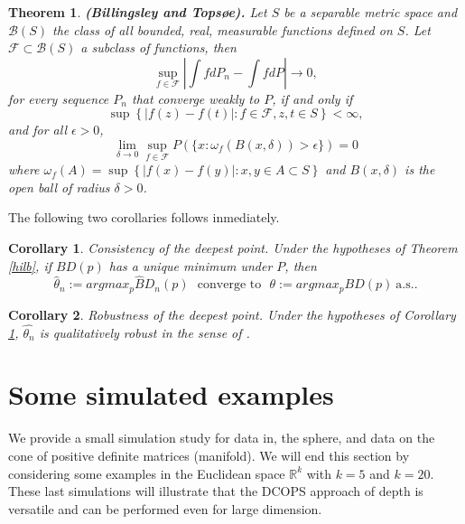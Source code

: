 \documentclass[a4paper]{article}
\numberwithin{equation}{section}
\newtheorem{theorem}{Theorem}[section]
\newtheorem{corollary}{Corollary}
\begin{document}
\begin{theorem}
\textbf{(Billingsley and Tops{\o}e).}  \textit{Let $S$ be a separable metric space and $\mathcal{B}(S)$ the class of all bounded, real,  measurable functions defined on $S$. Let $\mathcal{F} \subset \mathcal{B}(S)$ a subclass of functions, then 
$$
 \sup_{f \in \mathcal{F} } \left \vert \int f dP_n  - \int f dP \right \vert  \rightarrow 0,
$$ for every sequence $P_n$ that converge weakly to $P$, if and only if
\begin{equation}\label{BT1} 
\sup \left \{ \vert f(z)-f(t) \vert : f \in \mathcal{F},z,t \in S \right \} < \infty,
\end{equation} and for all $\epsilon >0$, 
\begin{equation} \label{BT2}\lim_{\delta \rightarrow 0} \sup_{f \in \mathcal{F}} P\left( \{ x: \omega_f \left( B(x,\delta) \right) > \epsilon \} \right)=0
\end{equation} where $\omega_f(A)=\sup \left \{ \vert f(x) -f(y )\vert: x,y \in A \subset S \right \}$ and $B(x, \delta)$ is the open ball of radius $\delta>0$.}
\end{theorem} 


The following two corollaries follows inmediately.
\begin{corollary} \label{cor00} Consistency of the deepest point. Under the hypotheses of Theorem \ref{hilb}, if $BD(p)$ has a unique minimum under $P$,  then 
$$ \hat\theta_n:= argmax_{p} \widehat BD_n(p)  \,\, \textrm{ converge to } \,\, \theta:=argmax_{p}  BD(p) \ \mbox {a.s.}.$$  
\end{corollary}

 \begin{corollary}  Robustness of the deepest point. Under the hypotheses of Corollary \ref{cor00}, $\hat{\theta_n}$ is qualitatively robust in the sense of \cite{hampel1971}.
\end{corollary}

\section{Some simulated examples}
\label{simulated}
We provide a small simulation study for data in, the sphere, and data on the cone of positive definite matrices (manifold). We will end this section by considering some examples in the Euclidean space $\mathbb R^k$ with $k=5$ and $k=20$. These last simulations will illustrate that the DCOPS approach of depth is versatile and can be performed even for large dimension.
\end{document}
